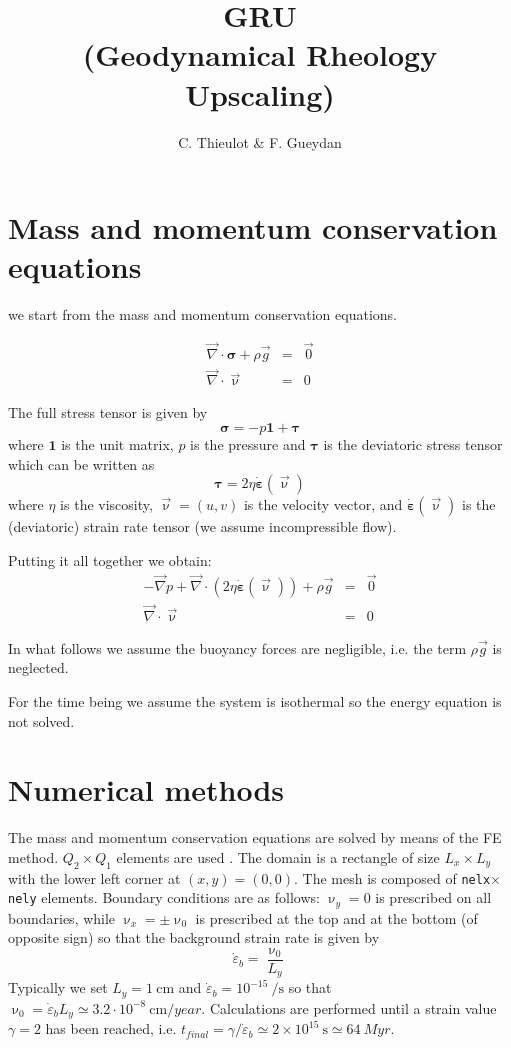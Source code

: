 \documentclass[a4paper]{article}
\title{{\Large \bf GRU} \\ (Geodynamical Rheology Upscaling)}
\author{C. Thieulot \& F. Gueydan}
\begin{document}
\maketitle


\section{Mass and momentum conservation equations}

we start from the mass and momentum conservation equations.

\begin{eqnarray}
\vec\nabla \cdot \bm \sigma + \rho \vec{g} &=& \vec{0} \\
\vec\nabla \cdot \vec\upnu &=& 0
\end{eqnarray}

The full stress tensor is given by
\[
\bm\sigma = -p {\bm 1} +  \bm \tau
\]
where ${\bm 1}$ is the unit matrix, $p$ is the pressure and 
${\bm\tau}$ is the deviatoric stress tensor which can be 
written as
\[
\bm\tau = 2 \eta \dot{\bm \varepsilon}(\vec\upnu)
\]
where $\eta$ is the viscosity, $\vec{\upnu}=(u,v)$ is the velocity vector, 
and $\dot{\bm \varepsilon}(\vec\upnu)$ is the (deviatoric) 
strain rate tensor (we assume incompressible flow).

Putting it all together we obtain:
\begin{eqnarray}
-\vec\nabla p + \vec\nabla \cdot (2 \eta \dot{\bm \varepsilon}(\vec\upnu)) + \rho \vec{g} &=& \vec{0} \\
\vec\nabla \cdot \vec\upnu &=& 0
\end{eqnarray}

In what follows we assume the buoyancy forces are negligible, i.e. 
the term $\rho \vec{g}$ is neglected.

For the time being we assume the system is isothermal 
so the energy equation is not solved.


\section{Numerical methods}

The mass and momentum conservation equations are 
solved by means of the FE method. 
$Q_2\times Q_1$ elements are used \cite{thba22}.
The domain is a rectangle of size $L_x \times L_y$
with the lower left corner at $(x,y)=(0,0)$.
The mesh is composed of \lstinline{nelx}$\times$\lstinline{nely} elements.
Boundary conditions are as follows: $\upnu_y=0$ is prescribed on 
all boundaries, while $\upnu_x=\pm \upnu_0$ is prescribed at the 
top and at the bottom (of opposite sign) so that the background 
strain rate is given by 
\[
\dot\varepsilon_b = \frac{\upnu_0}{L_y}
\]
Typically we set $L_y=1~\si{\cm}$ and 
$\dot\varepsilon_b =10^{-15}~\si{\per\second} $ so that 
$\upnu_0= \dot\varepsilon_b L_y \simeq 3.2\cdot 10^{-8}~\si{\cm\per year}$.
Calculations are performed until a strain value $\gamma=2$ 
has been reached, i.e. 
$t_{final} = \gamma/ \dot\varepsilon_b \simeq 2 \times 10^{15}~\si{\second} 
\simeq 64~\si{Myr}$.
\end{document}
